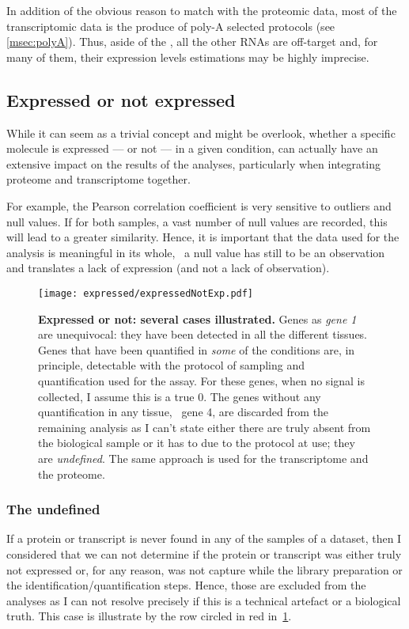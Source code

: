 In addition of the obvious reason to match with the proteomic data,
most of the transcriptomic data is the produce of poly-A selected protocols
(see \cref{msec:polyA}).
Thus, aside of the \mRNAs, all the other \glspl{RNA} are off-target
and, for many of them,
their expression levels estimations may be highly imprecise.



\subsection{Expressed or not expressed}
\label{sec:ExpressedOrNot}

While it can seem as a trivial concept and might be overlook, whether a specific
molecule is expressed --- or not --- in a given condition, can actually have
an extensive impact on the results of the analyses, particularly when integrating
proteome and transcriptome together.

For example, the Pearson correlation coefficient is very
sensitive to outliers and null values. If for both samples, a vast number of
null values are recorded, this will lead to a greater similarity.
Hence, it is important that the data used for the analysis is meaningful in
its whole, \ie\ a null value has still to be an observation and translates
a lack of expression (and not a lack of observation).

\begin{figure}[!htbp]
    \texttt{[image: expressed/expressedNotExp.pdf]}\centering
      \caption[Expressed or not: several cases illustrated]
      {\label{fig:DefineExpression}\textbf{Expressed or not: several cases
      illustrated.}\smallbreak{} Genes as \emph{gene 1} are unequivocal: they have been
      detected in all the different tissues. Genes that have been quantified in
      \emph{some} of the conditions are, in principle, detectable with the
      protocol of sampling and quantification used for the assay.
      For these genes, when no signal is collected, I assume this is a true $0$.
      The genes without any quantification
      in any tissue, \eg\ gene 4, are discarded from the remaining analysis as
      I can't state
      either there are truly absent from the biological sample or it has to due
      to the protocol at use; they are \emph{undefined}. The same approach is used
      for the transcriptome and the proteome.}
\end{figure}

\subsubsection{The undefined}%
\label{subsec:ExpressedOrNot-undefined}
If a protein or transcript is never found in any of the samples of a dataset,
then I considered that we can not determine if the protein or transcript was
either truly not expressed or, for any reason, was not capture while the library
preparation or the identification/quantification steps. Hence, those are
excluded from the analyses as I can not resolve precisely if this is a
technical artefact or a biological truth. This case is illustrate by the row
circled in red in~\cref{fig:DefineExpression}.

